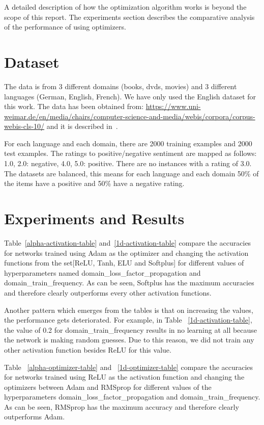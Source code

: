 \documentclass[11pt,a4paper]{article}
\begin{document}
A detailed description of how the optimization algorithm works is beyond the scope of this report. The experiments section describes the comparative analysis of the performance of using optimizers.


\section{Dataset}
The data is from 3 different domains (books, dvds, movies) and 3 different languages (German, English, French).
We have only used the English dataset for this work. The data has been obtained from: \url{https://www.uni-weimar.de/en/media/chairs/computer-science-and-media/webis/corpora/corpus-webis-cls-10/} and it is described in~\cite{PB:2010}.

For each language and each domain, there are 2000 training examples and 2000 test examples. The ratings to positive/negative sentiment are mapped as follows: 1.0, 2.0: negative, 4.0, 5.0: positive. There are no instances with a rating of 3.0. The datasets are balanced, this means for each language and each domain 50\% of the items have a positive and 50\% have a negative rating.

\section{Experiments and Results}
Table~\ref{alpha-activation-table} and~\ref{1d-activation-table} compare the accuracies for networks trained using Adam as the optimizer and changing the activation functions from the set[ReLU, Tanh, ELU and Softplus] for different values of hyperparameters named domain\_loss\_factor\_propagation and domain\_train\_frequency. As can be seen, Softplus has the maximum accuracies and therefore clearly outperforms every other activation functions.

Another pattern which emerges from the tables is that on increasing the values, the performance gets deteriorated. For example, in Table ~\ref{1d-activation-table}, the value of 0.2 for domain\_train\_frequency results in no learning at all because the network is making random guesses. Due to this reason, we did not train any other activation function besides ReLU for this value.

Table ~\ref{alpha-optimizer-table} and ~\ref{1d-optimizer-table} compare the accuracies for networks trained using ReLU as the activation function and changing the optimizers between Adam and RMSprop for different values of the hyperparameters domain\_loss\_factor\_propagation and domain\_train\_frequency. As can be seen, RMSprop has the maximum accuracy and therefore  clearly outperforms Adam.
\end{document}
